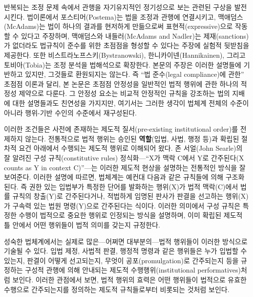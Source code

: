 \documentclass[12pt,a4paper]{article}
\begin{document}
\begin{itemize}
{    반복되는 조정 문제 속에서 관행을 자기유지적인 정기성으로 보는 관련된
    구상을 발전시킨다\autocite{Lewis1969}. 법이론에서 포스티머(Postema)는
    법을 조정과 관행에 연결시키고\autocite{Postema1982}, 맥애덤스(McAdams)는
    법이 하나의 결과를 현저하게 만듦으로써 표현적(expressive)으로 작동할
    수 있다고 주장하며\autocite{McAdams2000}, 맥애덤스와 내들러(McAdams and
    Nadler)는 제재(sanctions)가 없더라도 법규칙이 준수를 위한 초점점을
    형성할 수 있다는 주장에 실험적 뒷받침을
    제공한다\autocite{McAdamsNadler2005,McAdamsNadler2008}. 또한
    비스트라노프스키(Bystranowski), 한니카이넨(Hannikainen), 그리고
    토비아(Tobia)는 조정 분석을 법해석으로
    확장한다\autocite{BystranowskiHannikainenTobia2025}. 본문의 주장은
    이러한 설명들에 기반하고 있지만, 그것들로 환원되지는 않는다. 즉 ``법
    준수(legal compliance)에 관한'' 초점점 이론과 달리, 본 논문은 초점점
    안정성을 일반적인 법적 행위에 관한 하나의 적정성 제약으로 다룬다. 그
    안정성 요소는 비교적 안정적인 규칙을 강조하는 법의 지배에 대한
    설명들과도 친연성을 가지지만, 여기서는 그러한 생각이 법체계 전체의
    수준이 아니라 행위-기반 수인의 수준에서 재구성된다.
    \autocite{Raz1979RuleOfLaw}}
\end{itemize}

이러한 조건들은 사전에 존재하는 제도적 질서(pre-existing institutional
order)를 전제하지 않는다. 전통적으로 법적 행위는 승인된
\textbf{역할}(입법, 사법, 행정 등)과 확립된 절차적 요건 아래에서
수행되는 제도적 행위로 이해되어 왔다. 존 서얼(John Searle)의 잘 알려진
구성 규칙(constitutive rules) 정식화---``X가 맥락 C에서 Y로 간주된다(X
counts as Y in context C)''\autocite{Searle1995}---는 이러한 제도적 현상을
설명하는 전통적인 방식을 잘 보여준다. 이러한 설명에 따르면, 법체계는
예컨대 다음과 같은 규칙들에 의해 구조화된다. 즉 \textsf{권한 있는 입법부가
특정한 단어를 발화하는 행위(X)가 법적 맥락(C)에서 법률 규칙의 창출(Y)로
간주된다}거나, \textsf{적법하게 임명된 판사가 판결을 선고하는 행위(X)가
구속력 있는 법원 명령(Y)으로 간주된다}는 식이다. 이러한 의미에서 구성
규칙은 특정한 수행이 법적으로 중요한 행위로 인정되는 방식을 설명하며,
이미 확립된 제도적 틀 안에서 어떤 행위들이 법적 의미를 갖는지
규정한다.\autocite{Searle1969}

성숙한 법체계에서는 실제로 많은---어쩌면 대부분의---법적 행위들이 이러한
방식으로 기술될 수 있다. 입법 제정, 사법적 판결, 행정적 명령과 같은
행위들은 누가 입법할 수 있는지, 판결이 어떻게 선고되는지, 무엇이
공포(promulgation)로 간주되는지 등을 규정하는 구성적 관행에 의해
안내되는 제도적 수행행위(institutional performatives)처럼 보인다. 이러한
관점에서 보면, 법적 행위의 효력은 어떤 행위들이 법적으로 유효한 수행으로
간주되는지를 정의하는 제도적 규칙들로부터 비롯되는 것처럼 보인다.
\end{document}
